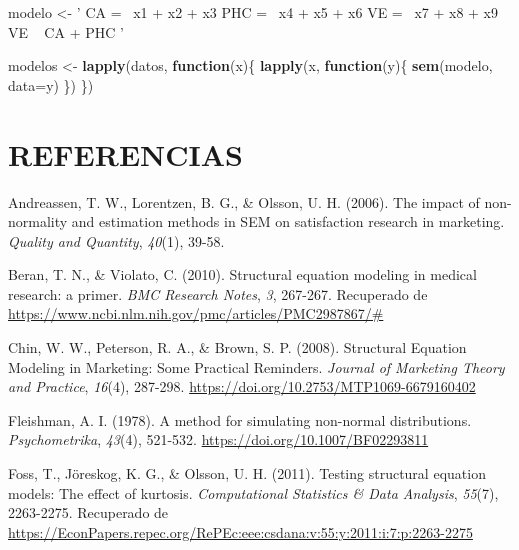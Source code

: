\documentclass[
]{article}
\newenvironment{Shaded}{\begin{snugshade}}{\end{snugshade}}
\newcommand{\ControlFlowTok}[1]{\textcolor[rgb]{0.13,0.29,0.53}{\textbf{#1}}}
\newcommand{\DataTypeTok}[1]{\textcolor[rgb]{0.13,0.29,0.53}{#1}}
\newcommand{\KeywordTok}[1]{\textcolor[rgb]{0.13,0.29,0.53}{\textbf{#1}}}
\newcommand{\NormalTok}[1]{#1}
\newcommand{\StringTok}[1]{\textcolor[rgb]{0.31,0.60,0.02}{#1}}
\begin{document}
\label{modelos_sem}

\begin{Shaded}
\begin{Highlighting}[]
\NormalTok{modelo <-}\StringTok{ ' CA =~ x1 + x2 + x3}
\StringTok{            PHC =~ x4 + x5 + x6}
\StringTok{            VE =~ x7 + x8 + x9}
\StringTok{            VE ~ CA + PHC '}

\NormalTok{modelos <-}\StringTok{ }\KeywordTok{lapply}\NormalTok{(datos, }\ControlFlowTok{function}\NormalTok{(x)\{}
  \KeywordTok{lapply}\NormalTok{(x, }\ControlFlowTok{function}\NormalTok{(y)\{}
    \KeywordTok{sem}\NormalTok{(modelo, }\DataTypeTok{data=}\NormalTok{y)}
\NormalTok{  \})}
\NormalTok{\})}
\end{Highlighting}
\end{Shaded}

\section{REFERENCIAS}

\hypertarget{refs}{}
\leavevmode\hypertarget{ref-andreassen}{}%
Andreassen, T. W., Lorentzen, B. G., \& Olsson, U. H. (2006). The impact
of non-normality and estimation methods in SEM on satisfaction research
in marketing. \emph{Quality and Quantity}, \emph{40}(1), 39-58.

\leavevmode\hypertarget{ref-Beran2010StructuralEM}{}%
Beran, T. N., \& Violato, C. (2010). Structural equation modeling in
medical research: a primer. \emph{BMC Research Notes}, \emph{3},
267-267. Recuperado de
\url{https://www.ncbi.nlm.nih.gov/pmc/articles/PMC2987867/\#}

\leavevmode\hypertarget{ref-chin}{}%
Chin, W. W., Peterson, R. A., \& Brown, S. P. (2008). Structural
Equation Modeling in Marketing: Some Practical Reminders. \emph{Journal
of Marketing Theory and Practice}, \emph{16}(4), 287-298.
\url{https://doi.org/10.2753/MTP1069-6679160402}

\leavevmode\hypertarget{ref-Fleishman1978}{}%
Fleishman, A. I. (1978). A method for simulating non-normal
distributions. \emph{Psychometrika}, \emph{43}(4), 521-532.
\url{https://doi.org/10.1007/BF02293811}

\leavevmode\hypertarget{ref-foss}{}%
Foss, T., Jöreskog, K. G., \& Olsson, U. H. (2011). Testing structural
equation models: The effect of kurtosis. \emph{Computational Statistics
\& Data Analysis}, \emph{55}(7), 2263-2275. Recuperado de
\url{https://EconPapers.repec.org/RePEc:eee:csdana:v:55:y:2011:i:7:p:2263-2275}
\end{document}
